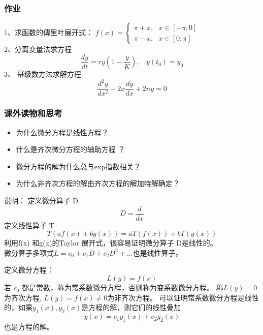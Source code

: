 
\begin{frame}
\frametitle{作业 }
	1、求函数的傳里叶展开式：
	$\displaystyle f(x)=\begin{cases}
		\pi +x , ~~~ x \in [-\pi, 0] \\
		\pi -x ,~~~ x \in   [0, \pi] 
	\end{cases}$ \\
	2、分离变量法求方程\\
	\begin{equation*}
		\frac{dy}{dt}	=  r y (1-\frac{y}{K}), ~~~~ y(t_0) = y_0
	\end{equation*}
	3、	幂级数方法求解方程\\
	\begin{equation*}
		\frac{d^2 y}{d x^2} -2x \frac{d y}{d x} +2n y =0 
	\end{equation*}     
\end{frame}

\begin{frame}
	\frametitle{课外读物和思考}
	\begin{itemize}
		\item 为什么微分方程是线性方程？
		\item 什么是齐次微分方程的辅助方程 ？
		\item 微分方程的解为什么总与exp指数相关？ 
		\item 为什么非齐次方程的解由齐次方程的解加特解确定？
	\end{itemize}	
\end{frame}

\begin{frame}
	\alert{说明：} 	定义微分算子 D
	\begin{equation*}
		D= \dfrac{d}{dx}
	\end{equation*}	
	定义线性算子 T
	\begin{equation*}
		T(a f(x) +b g(x) )  =a T(f(x)) +b T(g(x)) 
   \end{equation*}	
 	利用f(x) 和g(x)的Taylor 展开式，很容易证明微分算子 D是线性的。\\
	微分算子多项式$	L= c_0 + c_1D +c_2D^2 +...  $也是线性算子。\\
\end{frame}

\begin{frame}
    定义微分方程：
    \begin{equation*}
    	L(y)=f(x)
    \end{equation*}
    若{ $c_0$} 都是常数，称为常系数微分方程，否则称为变系数微分方程。 称$L(y)=0$为齐次方程, 	$L(y)=f(x)\ne0$为非齐次方程。 可以证明常系数微分方程是线性的，如果$y_1(x) ,  y_2(x) $是方程的解，则它们的线性叠加
    \begin{equation*}
    	y(x)=c_1y_1(x) +c_2y_2(x) 
    \end{equation*}	
    也是方程的解。
\end{frame}

